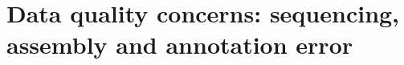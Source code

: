 
\section{Data quality concerns: sequencing, assembly and annotation error}
\label{sec_error_impact}

